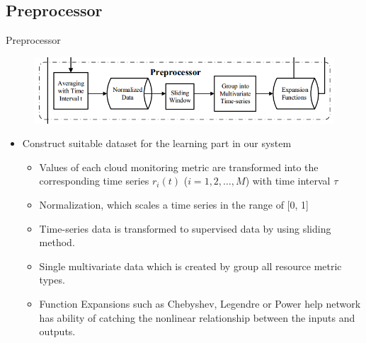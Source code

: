 \documentclass{beamer}
\newcommand{\notesize}{\fontsize{8}{10}\selectfont}
\begin{document}
\subsection{Preprocessor}
\begin{frame}{Preprocessor}
	\begin{figure}
		\centering
		\includegraphics[width=0.75 \textwidth]{preprocessor.png} %
		\label{fig:preprocessing}			
	\end{figure}
	\begin{itemize}
		\item{Construct suitable dataset for the learning part in our system }
		\begin{itemize}
			\item{\notesize Values of each cloud monitoring metric are transformed into the corresponding time series $r_i(t)$ ($i = 1, 2, \ldots, M$) with time interval $\tau$}
			\vspace{0.2cm}
			\item{\notesize Normalization, which scales a time series in the range of [0, 1]}
			\vspace{0.2cm}
			\item{\notesize Time-series data is transformed to supervised data by using sliding method.}
			\vspace{0.2cm}
			\item{\notesize Single multivariate data which is created by group all resource metric types.}
			\vspace{0.2cm}
			\item{\notesize Function Expansions such as Chebyshev, Legendre or Power help network has ability of catching the nonlinear relationship between the inputs and outputs.}
		\end{itemize}
	\end{itemize}
\end{frame}
\end{document}
